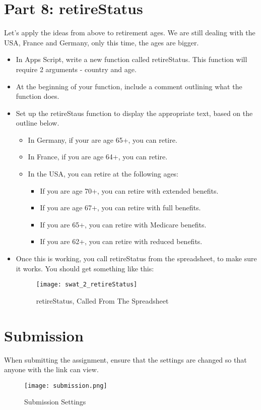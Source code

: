 \documentclass{article}
\begin{document}
\section*{Part 8: retireStatus}
Let's apply the ideas from above to retirement ages. We are still dealing with the USA, France and Germany, only this time, the ages are bigger.
\begin{itemize}
	\item In Apps Script, write a new function called retireStatus.  This function will require 2 arguments - country and age.
    	\item At the beginning of your function, include a comment outlining what the function does.
	\item Set up the retireStaus function to display the appropriate text, based on the outline below.
	\begin{itemize}
		\item In Germany, if your are age 65+, you can retire.
		\item In France, if you are age 64+, you can retire.
		\item In the USA, you can retire at the following ages:
		\begin{itemize}
			\item If you are age 70+, you can retire with extended benefits.
			\item If you are age 67+, you can retire with full benefits.
			\item If you are 65+, you can retire with Medicare benefits.
			\item If you are 62+, you can retire with reduced benefits.
		\end{itemize}
	\end{itemize}
	\item Once this is working, you call retireStatus from the spreadsheet, to make sure it works.  You should get something like this:
	\begin{figure}[H]
  		\centering
  		\texttt{[image: swat\_2\_retireStatus]}
  		\caption{retireStatus, Called From The Spreadsheet}
	\end{figure}
\end{itemize}

\section*{Submission}
When submitting the assignment, ensure that the settings are changed so that anyone with the link can view.
\begin{figure}[H]
  \centering
  \texttt{[image: submission.png]}
  \caption{Submission Settings}
\end{figure}
\end{document}
